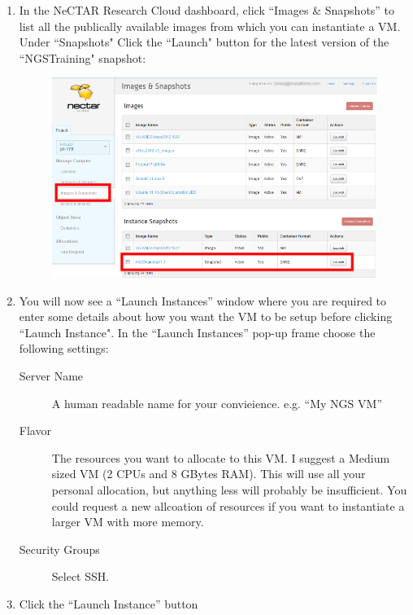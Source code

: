 \begin{enumerate}
  \item In the NeCTAR Research Cloud dashboard, click ``Images \& Snapshots''
  to list all the publically available images from which you can instantiate a
  VM. Under ``Snapshots" Click the ``Launch" button for the latest version of the
  ``NGSTraining" snapshot:
  \begin{figure}[H]
    \centering
    \includegraphics[scale=0.5]{post-workshop/nectar/dashboard_snapshots.png}
    \label{fig:dashboard_snapshots}
  \end{figure}
  \item You will now see a ``Launch Instances'' window where you are required to
  enter some details about how you want the VM to be setup before clicking
  ``Launch Instance".
  In the ``Launch Instances'' pop-up frame choose the following settings:
  \begin{description}
  \item[Server Name] A human readable name for your convieience. e.g. ``My NGS VM''
  \item[Flavor] The resources you want to allocate to this VM. I suggest a
  Medium sized VM (2 CPUs and 8 GBytes RAM). This will use all your personal
  allocation, but anything less will probably be insufficient. You could request
  a new allcoation of resources if you want to instantiate a larger VM with more
  memory.
  \item[Security Groups] Select SSH.
  \end{description}
  \item Click the ``Launch Instance'' button
  \begin{figure}[H]
    \centering

\end{figure}
\end{enumerate}
